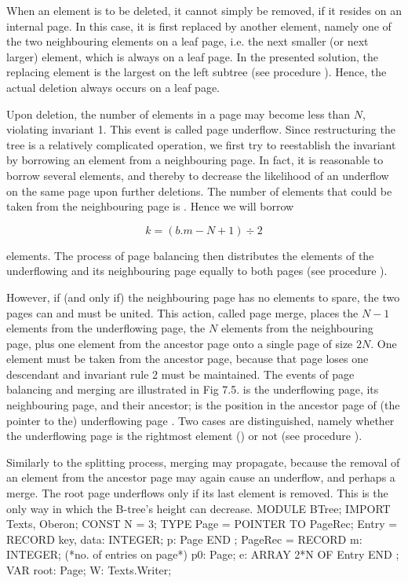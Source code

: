 
When an element is to be deleted, it cannot simply be removed, if it resides on an internal page. In this case, it is first replaced by another element, namely one of the two neighbouring elements on a leaf page, i.e. the next smaller (or next larger) element, which is always on a leaf page. In the presented solution, the replacing element is the largest on the left subtree (see procedure ). Hence, the actual deletion always occurs on a leaf page.

Upon deletion, the number of elements in a page may become less than $N$, violating invariant 1. This event is called page underflow. Since restructuring the tree is a relatively complicated operation, we first try to reestablish the invariant by borrowing an element from a neighbouring page. In fact, it is reasonable to borrow several elements, and thereby to decrease the likelihood of an underflow on the same page upon further deletions. The number of elements that could be taken from the neighbouring page  is . Hence we will borrow

$$k = (b.m - N + 1) \div 2$$

elements. The process of page balancing then distributes the elements of the underflowing and its neighbouring page equally to both pages (see procedure ).

However, if (and only if) the neighbouring page has no elements to spare, the two pages can and must be united. This action, called page merge, places the $N-1$ elements from the underflowing page, the $N$ elements from the neighbouring page, plus one element from the ancestor page onto a single page of size $2N$. One element must be taken from the ancestor page, because that page loses one descendant and invariant rule 2 must be maintained. The events of page balancing and merging are illustrated in Fig 7.5.  is the underflowing page,  its neighbouring page, and  their ancestor;  is the position in the ancestor page of (the pointer to the) underflowing page . Two cases are distinguished, namely whether the underflowing page is the rightmost element () or not (see procedure ).


Similarly to the splitting process, merging may propagate, because the removal of an element from the ancestor page may again cause an underflow, and perhaps a merge. The root page underflows only if its last element is removed. This is the only way in which the B-tree's height can decrease.
\begintt
MODULE BTree;
  IMPORT Texts, Oberon;
  CONST N = 3;
  TYPE Page = POINTER TO PageRec;
    Entry = RECORD
              key, data: INTEGER;
              p: Page
            END ;
    PageRec = RECORD
                m: INTEGER; (*no. of entries on page*)
                p0: Page;
                e: ARRAY 2*N OF Entry
              END ;
  VAR root: Page; W: Texts.Writer;

